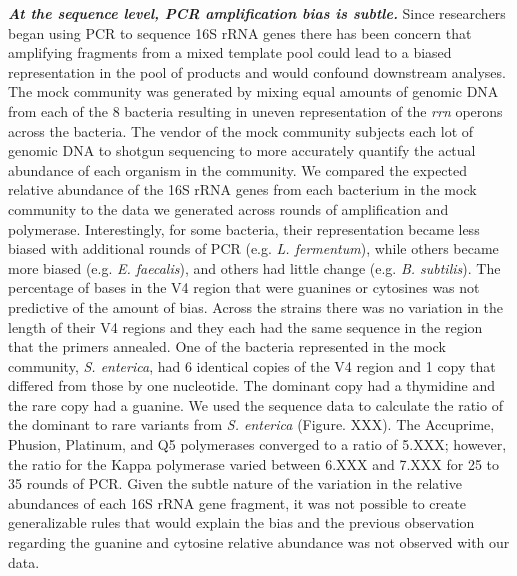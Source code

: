 \documentclass[11pt,]{article}
\begin{document}
\textbf{\emph{At the sequence level, PCR amplification bias is subtle.}}
Since researchers began using PCR to sequence 16S rRNA genes there has
been concern that amplifying fragments from a mixed template pool could
lead to a biased representation in the pool of products and would
confound downstream analyses. The mock community was generated by mixing
equal amounts of genomic DNA from each of the 8 bacteria resulting in
uneven representation of the \emph{rrn} operons across the bacteria. The
vendor of the mock community subjects each lot of genomic DNA to shotgun
sequencing to more accurately quantify the actual abundance of each
organism in the community. We compared the expected relative abundance
of the 16S rRNA genes from each bacterium in the mock community to the
data we generated across rounds of amplification and polymerase.
Interestingly, for some bacteria, their representation became less
biased with additional rounds of PCR (e.g. \emph{L. fermentum}), while
others became more biased (e.g. \emph{E. faecalis}), and others had
little change (e.g. \emph{B. subtilis}). The percentage of bases in the
V4 region that were guanines or cytosines was not predictive of the
amount of bias. Across the strains there was no variation in the length
of their V4 regions and they each had the same sequence in the region
that the primers annealed. One of the bacteria represented in the mock
community, \emph{S. enterica}, had 6 identical copies of the V4 region
and 1 copy that differed from those by one nucleotide. The dominant copy
had a thymidine and the rare copy had a guanine. We used the sequence
data to calculate the ratio of the dominant to rare variants from
\emph{S. enterica} (Figure. XXX). The Accuprime, Phusion, Platinum, and
Q5 polymerases converged to a ratio of 5.XXX; however, the ratio for the
Kappa polymerase varied between 6.XXX and 7.XXX for 25 to 35 rounds of
PCR. Given the subtle nature of the variation in the relative abundances
of each 16S rRNA gene fragment, it was not possible to create
generalizable rules that would explain the bias and the previous
observation regarding the guanine and cytosine relative abundance was
not observed with our data.
\end{document}
